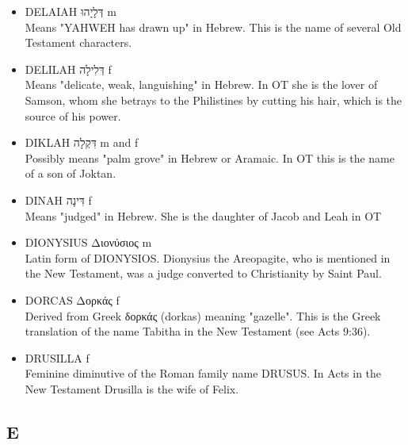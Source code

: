 \begin{itemize}
\item {DELAIAH דְּלָיָהוּ m}\\
Means "YAHWEH has drawn up" in Hebrew. This is the name of several Old Testament characters.

\item {DELILAH דְּלִילָה f}\\
Means "delicate, weak, languishing" in Hebrew. In OT she is the lover of Samson, whom she betrays to the Philistines by cutting his hair, which is the source of his power. 

\item {DIKLAH דִּקְלָה m and f}\\
Possibly means "palm grove" in Hebrew or Aramaic. In OT this is the name of a son of Joktan. 

\item {DINAH דִּינָה f}\\
Means "judged" in Hebrew. She is the daughter of Jacob and Leah in OT

\item {DIONYSIUS Διονύσιος m}\\
Latin form of DIONYSIOS. Dionysius the Areopagite, who is mentioned in the New Testament, was a judge converted to Christianity by Saint Paul. 

\item {DORCAS Δορκάς f}\\
Derived from Greek δορκάς (dorkas) meaning "gazelle". This is the Greek translation of the name Tabitha in the New Testament (see Acts 9:36).

\item {DRUSILLA f}\\
Feminine diminutive of the Roman family name DRUSUS. In Acts in the New Testament Drusilla is the wife of Felix.
\end{itemize}

\subsection{E}

